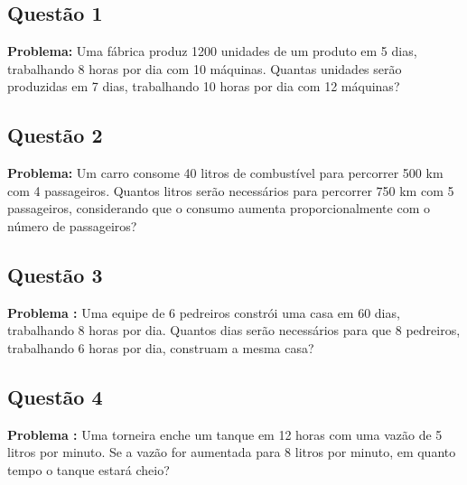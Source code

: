 \documentclass[12pt]{article}
\begin{document}
\begin{multicols}{2}
\subsection*{Questão 1}
\textbf{Problema:} Uma fábrica produz 1200 unidades de um produto em 5 dias, trabalhando 8 horas por dia com 10 máquinas. Quantas unidades serão produzidas em 7 dias, trabalhando 10 horas por dia com 12 máquinas?

\subsection*{Questão 2}
\textbf{Problema:} Um carro consome 40 litros de combustível para percorrer 500 km com 4 passageiros. Quantos litros serão necessários para percorrer 750 km com 5 passageiros, considerando que o consumo aumenta proporcionalmente com o número de passageiros?


\subsection*{Questão 3}
\textbf{Problema :} Uma equipe de 6 pedreiros constrói uma casa em 60 dias, trabalhando 8 horas por dia. Quantos dias serão necessários para que 8 pedreiros, trabalhando 6 horas por dia, construam a mesma casa?

\subsection*{Questão 4}
\textbf{Problema :} Uma torneira enche um tanque em 12 horas com uma vazão de 5 litros por minuto. Se a vazão for aumentada para 8 litros por minuto, em quanto tempo o tanque estará cheio?


\end{multicols}
\end{document}
